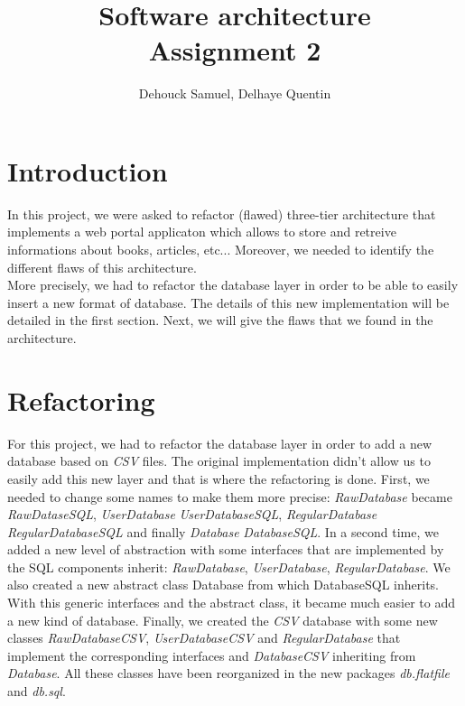 \documentclass[a4paper,10pt]{report}
\title{Software architecture \\ Assignment 2}
\author{ Dehouck Samuel, Delhaye Quentin \\}
\begin{document}
\maketitle

\chapter{Introduction}

In this project, we were asked to refactor (flawed) three-tier architecture that implements a web portal applicaton which allows to store and retreive informations about books, articles, etc... Moreover, we needed to identify the different flaws of
this architecture.\\
More precisely, we had to refactor the database layer in order to be able to easily insert a new format of database. The details of this new implementation will be detailed in the first section. Next, we will give the flaws that we found in the architecture.

\chapter{Refactoring}

For this project, we had to refactor the database layer in order to add a new database based on \textit{CSV} files. The original implementation didn't allow us to easily add this new layer and that is where the refactoring is done.
\newline
First, we needed to change some names to make them more precise: \textit{RawDatabase} became \textit{RawDataseSQL}, \textit{UserDatabase} \textit{UserDatabaseSQL}, \textit{RegularDatabase} \textit{RegularDatabaseSQL} and finally \textit{Database} \textit{DatabaseSQL}. 
\newline
In a second time, we added a new level of abstraction with some interfaces that are implemented by the SQL components inherit: \textit{RawDatabase}, \textit{UserDatabase}, \textit{RegularDatabase}.  We also created a new abstract 
class Database from which DatabaseSQL inherits. With this generic interfaces and the abstract class, it became much easier to add a new kind of database.
\newline
Finally, we created the \textit{CSV} database with some new classes \textit{RawDatabaseCSV}, \textit{UserDatabaseCSV} and \textit{RegularDatabase} that implement the corresponding interfaces and \textit{DatabaseCSV} inheriting from \textit{Database}.
\newline
All these classes have been reorganized in the new packages \textit{db.flatfile} and \textit{db.sql}.
\newline
\end{document}
